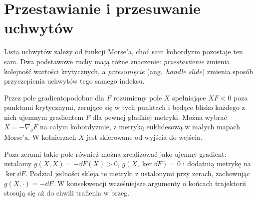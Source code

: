 \section{Przestawianie i przesuwanie uchwytów}
\label{sec:ruchy-uchwytow-18}

Lista uchwytów zależy od funkcji Morse'a,
choć sam kobordyzm pozostaje ten sam.
Dwa podstawowe ruchy mają różne znaczenie:
\emph{przestawienie} zmienia kolejność
wartości krytycznych, a \emph{przesunięcie}
(ang.\ \emph{handle slide}) zmienia sposób
przyczepienia uchwytów tego samego indeksu.

\begin{definicja}
\label{def:pole-spadku-18}
Przez pole gradientopodobne dla $F$ rozumiemy pole $X$
spełniające $XF<0$ poza punktami krytycznymi,
zerujące się w tych punktach i będące blisko każdego
z nich ujemnym gradientem $F$ dla pewnej gładkiej metryki.
Można wybrać $X=-\nabla_g F$ na całym kobordyzmie,
z metryką euklidesową w małych mapach Morse'a.
W kołnierzach $X$ jest skierowane od wyjścia do wejścia.
\end{definicja}

Poza zerami takie pole również można zrealizować
jako ujemny gradient: ustalamy
$g(X,X)=-\dd F(X)>0$, $g(X,\ker\dd F)=0$
i dodatnią metrykę na $\ker\dd F$.
Podział jedności skleja te metryki z ustalonymi
przy zerach, zachowując $g(X,\cdot)=-\dd F$.
W konsekwencji wcześniejsze argumenty o końcach
trajektorii stosują się aż do chwili trafienia w brzeg.

